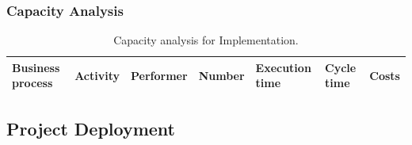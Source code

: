 \begin{alltt}

\end{alltt}


\subsubsection{Capacity Analysis}


\begin{landscape}
\begin{table}
\centering
{\tiny
\begin{tabular}{|l|l|l|l|l|l|l|}
Business process&Activity&Performer&Number&Execution time&Cycle time&Costs\\
\hline

\end{tabular}
}
\caption{Capacity analysis for Implementation.}
\end{table}
\end{landscape}
%

%

\subsection{Project Deployment}

